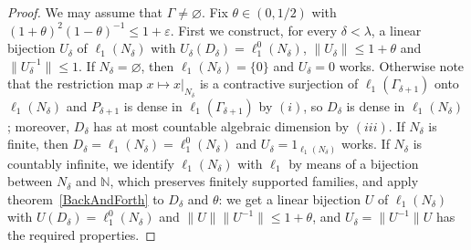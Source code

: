 \documentclass[12pt]{article}
\newcommand{\lo}[1]{\ell_1^0(#1)}
\newcommand{\ellone}[1]{\ell_1(#1)}
\newcommand{\norm}[1]{\lVert #1\rVert}
\begin{document}
\begin{proof} We may assume that $\Gamma\neq\varnothing$. Fix $\theta\in(0,1/2)$ with
    ${(1+\theta)}^2{(1-\theta)}^{-1}\leq 1+\varepsilon$. First we construct,
    for every $\delta<\lambda$, a linear bijection $U_\delta$ of
    $\ellone{N_\delta}$ with $U_\delta(D_\delta)=\lo{N_\delta}$,
    $\norm{U_\delta}\leq 1+\theta$ and $\norm{U_\delta^{-1}}\leq 1$. If
    $N_\delta=\varnothing$, then $\ellone{N_\delta}=\{0\}$ and $U_\delta=0$
    works. Otherwise note that the restriction map $x\mapsto x|_{N_\delta}$
    is a contractive surjection of $\ellone{\Gamma_{\delta+1}}$ onto
    $\ellone{N_\delta}$ and $P_{\delta+1}$ is dense in
    $\ellone{\Gamma_{\delta+1}}$ by $(i)$, so $D_\delta$ is dense in
    $\ellone{N_\delta}$; moreover, $D_\delta$ has at most countable algebraic
    dimension by $(iii)$. If $N_\delta$ is finite, then
    $D_\delta=\ellone{N_\delta}=\lo{N_\delta}$ and $U_\delta=1_{\ellone{N_\delta}}$
    works. If $N_\delta$ is countably infinite, we identify
    $\ellone{N_\delta}$ with $\ell_1$ by means of a bijection between
    $N_\delta$ and $\mathbb{N}$, which preserves finitely supported families,
    and apply theorem~\ref{BackAndForth} to $D_\delta$ and $\theta$: we get a
    linear bijection $U$ of $\ellone{N_\delta}$ with $U(D_\delta)=\lo{N_\delta}$
    and $\norm{U}\norm{U^{-1}}\leq 1+\theta$, and $U_\delta=\norm{U^{-1}}U$
    has the required properties.


\end{proof}
\end{document}
